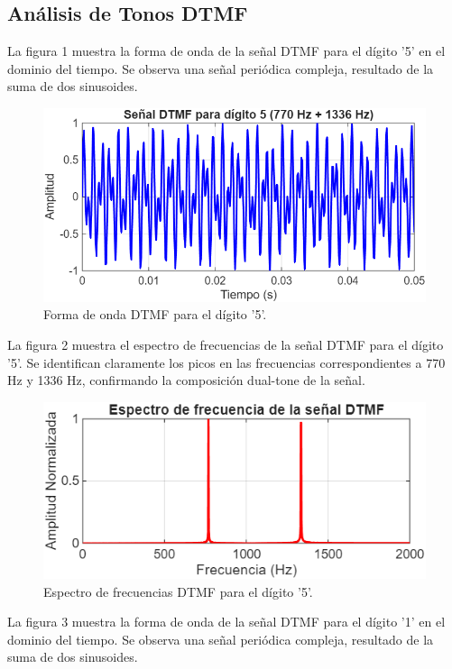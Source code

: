 \documentclass[journal]{IEEEtran} %
\begin{document}
\subsection{Análisis de Tonos DTMF}\label{AA}
La figura 1 muestra la forma de onda de la señal DTMF para el dígito '5' en el dominio del tiempo. Se observa una señal periódica compleja, resultado de la suma de dos sinusoides.
\begin{figure}[H]
    \centerline{\includegraphics[width=0.8\columnwidth]{Figure_1.png}}
    \caption{Forma de onda DTMF para el dígito '5'.}
    \label{fig}
\end{figure}


La figura 2 muestra el espectro de frecuencias de la señal DTMF para el dígito '5'. Se identifican claramente los picos en las frecuencias correspondientes a 770 Hz y 1336 Hz, confirmando la composición dual-tone de la señal.

\begin{figure}[H]
    \centerline{\includegraphics[width=0.8\columnwidth]{Figure_2.png}}
    \caption{Espectro de frecuencias DTMF para el dígito '5'.}
    \label{fig}
\end{figure}

La figura 3 muestra la forma de onda de la señal DTMF para el dígito '1' en el dominio del tiempo. Se observa una señal periódica compleja, resultado de la suma de dos sinusoides.
\end{document}
